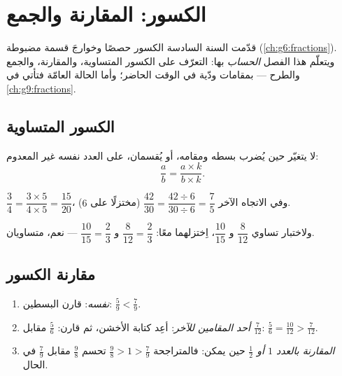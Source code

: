\chapter{الكسور: المقارنة والجمع}\label{ch:g7:fractions}

قدّمت السنة السادسة الكسور حصصًا وخوارجَ قسمة مضبوطة
(\cref{ch:g6:fractions}). ويتعلّم هذا الفصل \emph{الحساب} بها:
التعرّف على الكسور المتساوية، والمقارنة، والجمع والطرح
--- بمقامات ودّية في الوقت الحاضر؛ وأما الحالة العامّة فتأتي في
\cref{ch:g9:fractions}.

\section{الكسور المتساوية}

\begin{theorem}\label{thm:g7:fractions:equal}
لا يتغيّر  حين يُضرب بسطه ومقامه، أو يُقسمان،
على العدد نفسه غير المعدوم:
\[
\frac{a}{b} = \frac{a \times k}{b \times k} .
\]
\end{theorem}
\admitted

\begin{example}\label{ex:g7:fractions:equal}
$\dfrac{3}{4} = \dfrac{3 \times 5}{4 \times 5} = \dfrac{15}{20}$، وفي
الاتجاه الآخر $\dfrac{42}{30} = \dfrac{42 \div 6}{30 \div 6}
= \dfrac{7}{5}$ (مختزلًا على $6$).

ولاختبار تساوي $\dfrac{8}{12}$ و $\dfrac{10}{15}$،
اِختزلهما معًا: $\dfrac{8}{12} = \dfrac{2}{3}$ و
$\dfrac{10}{15} = \dfrac{2}{3}$ --- نعم، متساويان.
\end{example}

\section{مقارنة الكسور}

\begin{method}\label{met:g7:fractions:compare}
\begin{enumerate}
  \item \emph{ نفسه}: قارن البسطين:
        $\frac{5}{9} < \frac{7}{9}$.
  \item \emph{أحد المقامين  للآخر}: أعِد كتابة
         الأخشن، ثم قارن:
        $\frac{5}{6}$ مقابل $\frac{7}{12}$: $\frac56 = \frac{10}{12} >
        \frac{7}{12}$.
  \item \emph{المقارنة بالعدد $1$ أو $\frac12$} حين يمكن:
        فالمتراجحة $\frac{9}{8} > 1 > \frac{7}{9}$ تحسم
        $\frac98$ مقابل $\frac79$ في الحال.
\end{enumerate}
\end{method}


